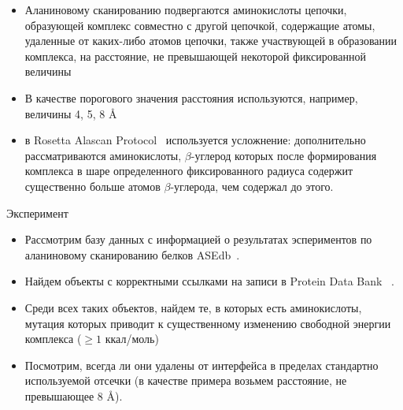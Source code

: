 \begin{itemize}
\item Аланиновому сканированию подвергаются аминокислоты цепочки, образующей комплекс совместно с другой цепочкой, содержащие атомы, удаленные от каких-либо атомов цепочки, также участвующей в образовании комплекса, на расстояние, не превышающей некоторой фиксированной величины

\item В качестве порогового значения расстояния используются, например, величины 4, 5, 8 \AA{}

\item в Rosetta Alascan Protocol~\cite{kortemme2004} используется усложнение: дополнительно рассматриваются аминокислоты, $\beta$-углерод которых после формирования комплекса в шаре определенного фиксированного радиуса содержит существенно больше атомов $\beta$-углерода, чем содержал до этого.
\end{itemize}
Эксперимент
\begin{itemize}
\item Рассмотрим базу данных с информацией о результатах эспериментов по аланиновому сканированию белков ASEdb~\cite{asedb2001}.
\item Найдем объекты с корректными ссылками на записи в Protein Data Bank ~\cite{rcsb}.
\item Среди всех таких объектов, найдем те, в которых есть аминокислоты, мутация которых приводит к существенному изменению свободной энергии комплекса ($\geq 1$ ккал/моль)
\item Посмотрим, всегда ли они удалены от интерфейса в пределах стандартно используемой отсечки (в качестве примера возьмем расстояние, не превышающее 8 \AA{}).
\end{itemize}


